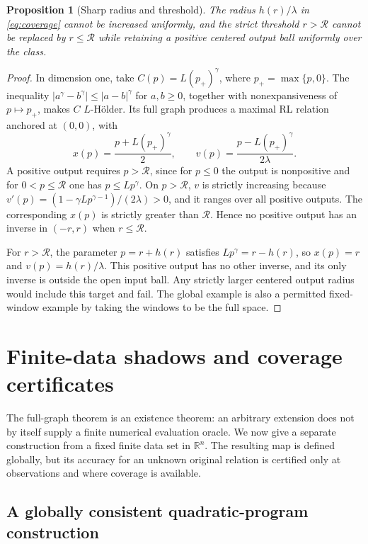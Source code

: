 \documentclass[11pt]{article}
\numberwithin{equation}{section}
\newtheorem{proposition}[theorem]{Proposition}
\theoremstyle{definition}
\theoremstyle{remark}
\newcommand{\R}{\mathbb R}
\newcommand{\rad}{\mathcal R}
\newcommand{\abs}[1]{\lvert #1\rvert}
\begin{document}
\begin{proposition}[Sharp radius and threshold]\label{prop:coveragesharp}
The radius $h(r)/\lambda$ in \eqref{eq:coverage} cannot be increased
uniformly, and the strict threshold $r>\rad$ cannot be replaced by
$r\le\rad$ while retaining a positive centered output ball uniformly
over the class.
\end{proposition}

\begin{proof}
In dimension one, take $C(p)=L(p_+)^\gamma$, where
$p_+=\max\{p,0\}$. The inequality
$\abs{a^\gamma-b^\gamma}\le\abs{a-b}^\gamma$ for $a,b\ge0$,
together with nonexpansiveness of $p\mapsto p_+$, makes $C$
$L$-H\"older. Its full graph produces a maximal RL relation anchored
at $(0,0)$, with
\[
 x(p)=\frac{p+L(p_+)^\gamma}{2},\qquad
 v(p)=\frac{p-L(p_+)^\gamma}{2\lambda}.
\]
A positive output requires $p>\rad$, since for $p\le0$ the output
is nonpositive and for $0<p\le\rad$ one has $p\le Lp^\gamma$.
On $p>\rad$, $v$ is strictly increasing because
$v'(p)=(1-\gamma Lp^{\gamma-1})/(2\lambda)>0$, and it ranges over
all positive outputs. The corresponding $x(p)$ is strictly greater
than $\rad$. Hence no positive output has an inverse in
$(-r,r)$ when $r\le\rad$.

For $r>\rad$, the parameter $p=r+h(r)$ satisfies
$L p^\gamma=r-h(r)$, so $x(p)=r$ and
$v(p)=h(r)/\lambda$. This positive output has no other inverse,
and its only inverse is outside the open input ball. Any strictly
larger centered output radius would include this target and fail.
The global example is also a permitted fixed-window example by taking
the windows to be the full space.
\end{proof}

\section{Finite-data shadows and coverage certificates}\label{sec:finite}

The full-graph theorem is an existence theorem: an arbitrary extension
does not by itself supply a finite numerical evaluation oracle. We now
give a separate construction from a fixed finite data set in $\R^n$.
The resulting map is defined globally, but its accuracy for an unknown
original relation is certified only at observations and where coverage
is available.

\subsection{A globally consistent quadratic-program construction}
\end{document}
